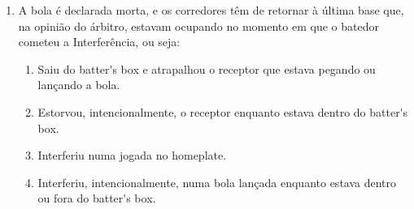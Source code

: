 \begin{multicols}{2}
\begin{enumerate}[label=\alph*)]
\begin{enumerate}[label=\roman*.]
			\begin{enumerate}[label=\arabic*)]
				\item Ele esteja dentro do \gls{batter's box}, e o contato \'e feito enquanto o \gls{bat} est\'a em suas m\~aos. \'E declarado um \gls{foulball}. 
				\item Ele derrube o \gls{bat} e a bola role contra esse \gls{bat} em territ\'orio \gls{fair}; e, na opini\~ao do \'arbitro, n\~ao houve inten\c{c}\~ao alguma de interferir no curso dessa bola; a bola batida deve ser julgada, se \'e \gls{fair} ou \gls{foul}, dependendo de onde ela para ou \'e tocada primeiro por um defensor. 
			\end{enumerate}
		\end{enumerate}
		\item  A bola \'e declarada morta, e os corredores t\^em de retornar \`a \'ultima base que, na opini\~ao do \'arbitro, estavam ocupando no momento em que o batedor cometeu a Interfer\^encia, ou seja: 
		
		\begin{enumerate}[label=\roman*.]
			\item  Saiu do \gls{batter's box} e atrapalhou o receptor que estava pegando ou lan\c{c}ando a bola. 
			\item Estorvou, intencionalmente, o receptor enquanto estava dentro do \gls{batter's box}. 
			\item  Interferiu numa jogada no \gls{homeplate}. 
			\item Interferiu, intencionalmente, numa bola lan\c{c}ada enquanto estava dentro ou fora do \gls{batter's box}. 
		\end{enumerate}
		
	\end{enumerate}
\end{multicols}
